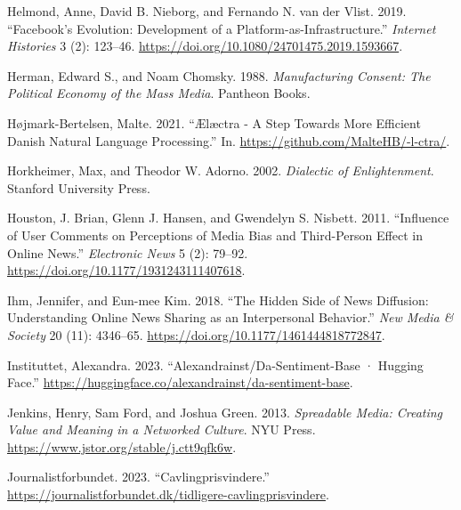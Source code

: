 \documentclass[
]{article}
\newlength{\cslhangindent}
\newlength{\cslentryspacingunit} %
\newenvironment{CSLReferences}[2] %
 {%
  \setlength{\parindent}{0pt}
  \ifodd #1
  \let\oldpar\par
  \def\par{\hangindent=\cslhangindent\oldpar}
  \fi
  \setlength{\parskip}{#2\cslentryspacingunit}
 }%
 {}
\begin{document}
\begin{CSLReferences}{1}{0}
\leavevmode{}%
Helmond, Anne, David B. Nieborg, and Fernando N. van der Vlist. 2019.
{``Facebook's Evolution: Development of a Platform-as-Infrastructure.''}
\emph{Internet Histories} 3 (2): 123--46.
\url{https://doi.org/10.1080/24701475.2019.1593667}.

\leavevmode{}%
Herman, Edward S., and Noam Chomsky. 1988. \emph{Manufacturing
{Consent}: {The} {Political} {Economy} of the {Mass} {Media}}. Pantheon
Books.

\leavevmode{}%
Højmark-Bertelsen, Malte. 2021. {``Ælæctra - {A} {Step} {Towards} {More}
{Efficient} {Danish} {Natural} {Language} {Processing}.''} In.
\url{https://github.com/MalteHB/-l-ctra/}.

\leavevmode{}%
Horkheimer, Max, and Theodor W. Adorno. 2002. \emph{Dialectic of
{Enlightenment}}. Stanford University Press.

\leavevmode{}%
Houston, J. Brian, Glenn J. Hansen, and Gwendelyn S. Nisbett. 2011.
{``Influence of {User} {Comments} on {Perceptions} of {Media} {Bias} and
{Third}-{Person} {Effect} in {Online} {News}.''} \emph{Electronic News}
5 (2): 79--92. \url{https://doi.org/10.1177/1931243111407618}.

\leavevmode{}%
Ihm, Jennifer, and Eun-mee Kim. 2018. {``The Hidden Side of News
Diffusion: {Understanding} Online News Sharing as an Interpersonal
Behavior.''} \emph{New Media \& Society} 20 (11): 4346--65.
\url{https://doi.org/10.1177/1461444818772847}.

\leavevmode{}%
Instituttet, Alexandra. 2023. {``Alexandrainst/Da-Sentiment-Base ·
{Hugging} {Face}.''}
\url{https://huggingface.co/alexandrainst/da-sentiment-base}.

\leavevmode{}%
Jenkins, Henry, Sam Ford, and Joshua Green. 2013. \emph{Spreadable
{Media}: {Creating} {Value} and {Meaning} in a {Networked} {Culture}}.
NYU Press. \url{https://www.jstor.org/stable/j.ctt9qfk6w}.

\leavevmode{}%
Journalistforbundet. 2023. {``Cavlingprisvindere.''}
\url{https://journalistforbundet.dk/tidligere-cavlingprisvindere}.


\end{CSLReferences}
\end{document}

